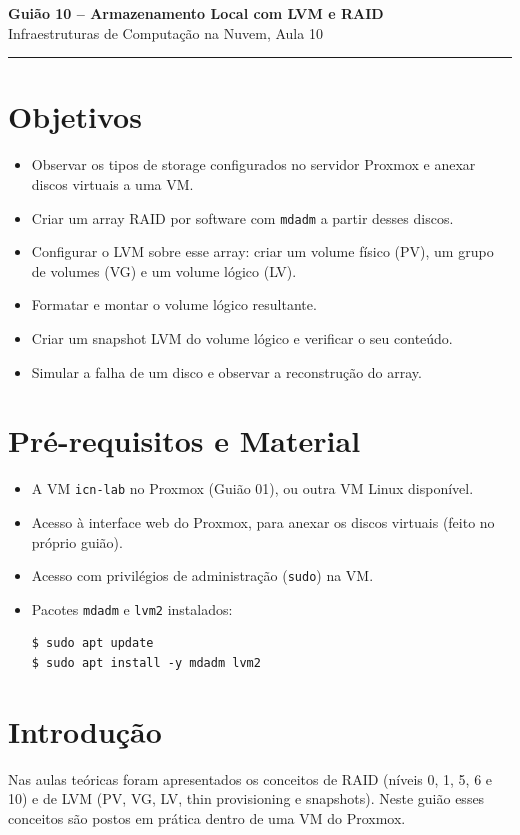 \documentclass[11pt,a4paper]{article}
\newcommand{\guiaotitle}[2]{%
  \begin{center}
  {\Large\bfseries\color{TextEspresso} #1}\\[0.3cm]
  {\normalsize\color{NudeTaupe} #2}\\[0.2cm]
  {\color{NudeTaupe}\rule{4cm}{0.5pt}}
  \end{center}
  \vspace{0.5cm}
}
\begin{document}
\guiaotitle{Guião 10 -- Armazenamento Local com LVM e RAID}{Infraestruturas de Computação na Nuvem, Aula 10}

\section{Objetivos}
\begin{itemize}
    \setlength\itemsep{0.2cm}
    \item Observar os tipos de storage configurados no servidor Proxmox e anexar discos virtuais a uma VM.
    \item Criar um array RAID por software com \texttt{mdadm} a partir desses discos.
    \item Configurar o LVM sobre esse array: criar um volume físico (PV), um grupo de volumes (VG) e um volume lógico (LV).
    \item Formatar e montar o volume lógico resultante.
    \item Criar um snapshot LVM do volume lógico e verificar o seu conteúdo.
    \item Simular a falha de um disco e observar a reconstrução do array.
\end{itemize}

\section{Pré-requisitos e Material}
\begin{itemize}
    \setlength\itemsep{0.2cm}
    \item A VM \texttt{icn-lab} no Proxmox (Guião 01), ou outra VM Linux disponível.
    \item Acesso à interface web do Proxmox, para anexar os discos virtuais (feito no próprio guião).
    \item Acesso com privilégios de administração (\texttt{sudo}) na VM.
    \item Pacotes \texttt{mdadm} e \texttt{lvm2} instalados:
\begin{lstlisting}
$ sudo apt update
$ sudo apt install -y mdadm lvm2
\end{lstlisting}
\end{itemize}

\section{Introdução}
Nas aulas teóricas foram apresentados os conceitos de RAID (níveis 0, 1, 5, 6 e 10) e de LVM (PV, VG, LV, thin provisioning e snapshots). Neste guião esses conceitos são postos em prática dentro de uma VM do Proxmox.
\end{document}

